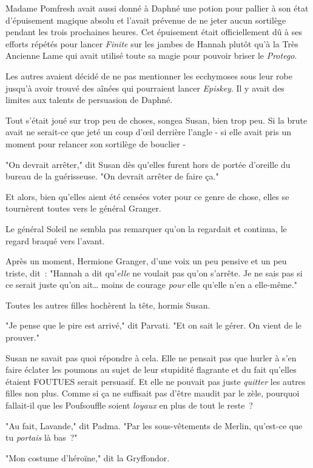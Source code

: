 Madame Pomfresh avait aussi donné à Daphné une potion pour pallier à son état d'épuisement magique absolu et l'avait prévenue de ne jeter aucun sortilège pendant les trois prochaines heures. Cet épuisement était officiellement dû à ses efforts répétés pour lancer \emph{Finite} sur les jambes de Hannah plutôt qu'à la Très Ancienne Lame qui avait utilisé toute sa magie pour pouvoir briser le \emph{Protego}.

Les autres avaient décidé de ne pas mentionner les ecchymoses sous leur robe jusqu'à avoir trouvé des aînées qui pourraient lancer \emph{Episkey}. Il y avait des limites aux talents de persuasion de Daphné.

Tout s'était joué sur trop peu de choses, songea Susan, bien trop peu. Si la brute avait ne serait-ce que jeté un coup d'œil derrière l'angle - si elle avait pris un moment pour relancer son sortilège de bouclier -

"On devrait arrêter," dit Susan dès qu'elles furent hors de portée d'oreille du bureau de la guérisseuse. "On devrait arrêter de faire ça."

Et alors, bien qu'elles aient été censées voter pour ce genre de chose, elles se tournèrent toutes vers le général Granger.

Le général Soleil ne sembla pas remarquer qu'on la regardait et continua, le regard braqué vers l'avant.

Après un moment, Hermione Granger, d'une voix un peu pensive et un peu triste, dit~: "Hannah a dit qu'\emph{elle} ne voulait pas qu'on s'arrête. Je ne sais pas si ce serait juste qu'on ait… moins de courage \emph{pour} elle qu'elle n'en a elle-même."

Toutes les autres filles hochèrent la tête, hormis Susan.

"Je pense que le pire est arrivé," dit Parvati. "Et on sait le gérer. On vient de le prouver."

Susan ne savait pas quoi répondre à cela. Elle ne pensait pas que hurler à s'en faire éclater les poumons au sujet de leur stupidité flagrante et du fait qu'elles étaient FOUTUES serait persuasif. Et elle ne pouvait pas juste \emph{quitter} les autres filles non plus. Comme si ça ne suffisait pas d'être maudit par le zèle, pourquoi fallait-il que les Poufsouffle soient \emph{loyaux} en plus de tout le reste~?

"Au fait, Lavande," dit Padma. "Par les sous-vêtements de Merlin, qu'est-ce que tu \emph{portais} là bas~?"

"Mon costume d'héroïne," dit la Gryffondor.

